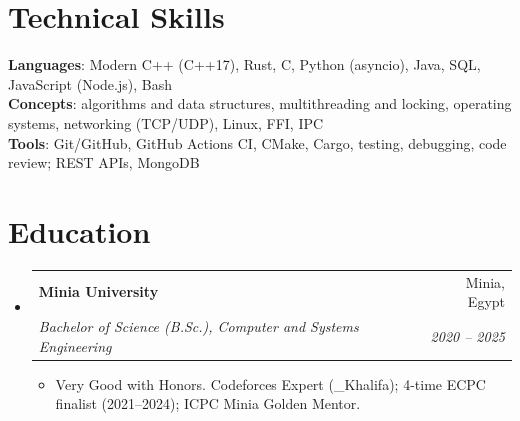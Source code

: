 \documentclass[letterpaper,11pt]{article}
\makeatletter
\newcommand{\resumeItem}[1]{
  \item\small{
    {#1 \vspace{-2pt}}
  }
}
\newcommand{\resumeSubheading}[4]{
  \vspace{-2pt}\item
    \begin{tabular*}{0.97\textwidth}[t]{l@{\extracolsep{\fill}}r}
      \textbf{#1} & #2 \\
      \textit{\small#3} & \textit{\small #4} \\
    \end{tabular*}\vspace{-7pt}
}
\newcommand{\resumeSubHeadingListStart}{\begin{itemize}[leftmargin=0.15in, label={}]}
\newcommand{\resumeSubHeadingListEnd}{\end{itemize}}
\newcommand{\resumeItemListStart}{\begin{itemize}}
\newcommand{\resumeItemListEnd}{\end{itemize}\vspace{-5pt}}
\makeatother
\begin{document}
\section{Technical Skills}
 \begin{itemize}[leftmargin=0.15in, label={}]
    \small{\item{
     \textbf{Languages}{: Modern C++ (C++17), Rust, C, Python (asyncio), Java, SQL, JavaScript (Node.js), Bash} \\
     \textbf{Concepts}{: algorithms and data structures, multithreading and locking, operating systems, networking (TCP/UDP), Linux, FFI, IPC} \\
     \textbf{Tools}{: Git/GitHub, GitHub Actions CI, CMake, Cargo, testing, debugging, code review; REST APIs, MongoDB}
    }}
 \end{itemize}

\section{Education}
  \resumeSubHeadingListStart
    \resumeSubheading
      {Minia University}{Minia, Egypt}
      {Bachelor of Science (B.Sc.), Computer and Systems Engineering}{2020 -- 2025}
      \resumeItemListStart
        \resumeItem{Very Good with Honors. Codeforces Expert (\_Khalifa); 4-time ECPC finalist (2021--2024); ICPC Minia Golden Mentor.}
      \resumeItemListEnd
  \resumeSubHeadingListEnd


\end{document}
